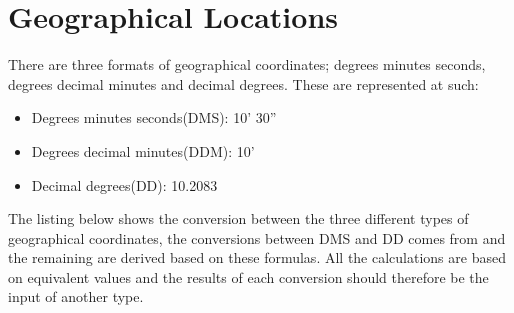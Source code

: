 \section{Geographical Locations} \label{sec:geo_coordinates}
There are three formats of geographical coordinates; degrees minutes seconds, degrees decimal minutes and decimal degrees. These are represented at such:
\begin{itemize}
	\item Degrees minutes seconds(DMS): 10' 30''
	\item Degrees decimal minutes(DDM): 10'
	\item Decimal degrees(DD): 10.2083\degree
\end{itemize}

The listing below shows the conversion between the three different types of geographical coordinates, the conversions between DMS and DD comes from\cite{geo_converter} and the remaining are derived based on these formulas. All the calculations are based on equivalent values and the results of each conversion should therefore be the input of another type.


